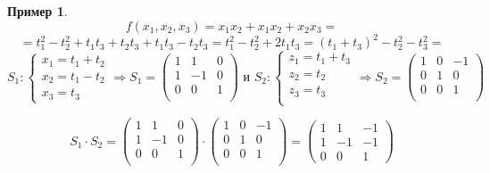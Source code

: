 \documentclass[a4paper, 12pt]{article}
\theoremstyle{definition}
\newtheorem*{example}{Пример}
\begin{document}
\begin{example}
    $$ f(x_1, x_2, x_3) = x_1 x_2 + x_1 x_2 + x_2 x_3 = $$
    $$ = t_1^2 - t_2^2 + t_1t_3 +t_2t_3 + t_1t_3 - t_2t_3 = t_1^2 - t_2^2 + 2t_1 t_3 = (t_1 + t_3)^2 - t_2^2 - t_3^2 = $$
    $$ S_1: \begin{cases}
            x_1 = t_1 + t_2 \\
            x_2 = t_1 - t_2 \\
            x_3 = t_3
        \end{cases} \Rightarrow S_1 = \begin{pmatrix}
            1 & 1  & 0 \\
            1 & -1 & 0 \\
            0 & 0  & 1 \\
        \end{pmatrix} \text{ и } S_2: \begin{cases}
            z_1 = t_1 + t_3 \\
            z_2 = t_2       \\
            z_3 = t_3       \\
        \end{cases} \Rightarrow S_2 = \begin{pmatrix}
            1 & 0 & -1 \\
            0 & 1 & 0  \\
            0 & 0 & 1  \\
        \end{pmatrix}$$

    $$ S_1 \cdot S_2 = \begin{pmatrix}
            1 & 1  & 0 \\
            1 & -1 & 0 \\
            0 & 0  & 1 \\
        \end{pmatrix} \cdot \begin{pmatrix}
            1 & 0 & -1 \\
            0 & 1 & 0  \\
            0 & 0 & 1  \\
        \end{pmatrix} = \begin{pmatrix}
            1 & 1  & -1 \\
            1 & -1 & -1 \\
            0 & 0  & 1
        \end{pmatrix} $$

\end{example}
\end{document}
